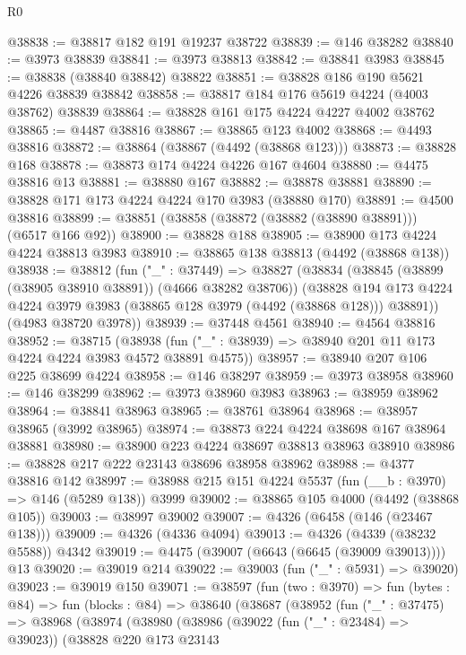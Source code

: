 \begin{lexlean}{R0}
\begin{coremodule}
@38838 := @38817 @182 @191 @19237 @38722
@38839 := @146 @38282
@38840 := @3973 @38839
@38841 := @3973 @38813
@38842 := @38841 @3983
@38845 := @38838 (@38840 @38842) @38822
@38851 := @38828 @186 @190 @5621 @4226 @38839 @38842
@38858 := @38817 @184 @176 @5619 @4224 (@4003 @38762) @38839
@38864 := @38828 @161 @175 @4224 @4227 @4002 @38762
@38865 := @4487 @38816
@38867 := @38865 @123 @4002
@38868 := @4493 @38816
@38872 := @38864 (@38867 (@4492 (@38868 @123)))
@38873 := @38828 @168
@38878 := @38873 @174 @4224 @4226 @167 @4604
@38880 := @4475 @38816 @13
@38881 := @38880 @167
@38882 := @38878 @38881
@38890 := @38828 @171 @173 @4224 @4224 @170 @3983 (@38880 @170)
@38891 := @4500 @38816
@38899 := @38851 (@38858 (@38872 (@38882 (@38890 @38891))) (@6517 @166 @92))
@38900 := @38828 @188
@38905 := @38900 @173 @4224 @4224 @38813 @3983
@38910 := @38865 @138 @38813 (@4492 (@38868 @138))
@38938 := @38812
    (fun ("_" : @37449) =>
    @38827
      (@38834
        (@38845 (@38899 (@38905 @38910 @38891)) (@4666 @38282 @38706))
        (@38828 @194 @173 @4224 @4224 @3979 @3983 (@38865 @128 @3979 (@4492 (@38868 @128))) @38891))
      (@4983 @38720 @3978))
@38939 := @37448 @4561
@38940 := @4564 @38816
@38952 := @38715
    (@38938 (fun ("_" : @38939) => @38940 @201 @11 @173 @4224 @4224 @3983 @4572 @38891 @4575))
@38957 := @38940 @207 @106 @225 @38699 @4224
@38958 := @146 @38297
@38959 := @3973 @38958
@38960 := @146 @38299
@38962 := @3973 @38960 @3983
@38963 := @38959 @38962
@38964 := @38841 @38963
@38965 := @38761 @38964
@38968 := @38957 @38965 (@3992 @38965)
@38974 := @38873 @224 @4224 @38698 @167 @38964 @38881
@38980 := @38900 @223 @4224 @38697 @38813 @38963 @38910
@38986 := @38828 @217 @222 @23143 @38696 @38958 @38962
@38988 := @4377 @38816 @142
@38997 := @38988 @215 @151 @4224 @5537 (fun (__b : @3970) => @146 (@5289 @138)) @3999
@39002 := @38865 @105 @4000 (@4492 (@38868 @105))
@39003 := @38997 @39002
@39007 := @4326 (@6458 (@146 (@23467 @138)))
@39009 := @4326 (@4336 @4094)
@39013 := @4326 (@4339 (@38232 @5588)) @4342
@39019 := @4475 (@39007 (@6643 (@6645 (@39009 @39013)))) @13
@39020 := @39019 @214
@39022 := @39003 (fun ("_" : @5931) => @39020)
@39023 := @39019 @150
@39071 := @38597
    (fun (two : @3970) =>
    fun (bytes : @84) =>
    fun (blocks : @84) =>
    @38640
      (@38687
        (@38952
          (fun ("_" : @37475) =>
          @38968
            (@38974
              (@38980
                (@38986
                  (@39022 (fun ("_" : @23484) => @39023))
                  (@38828
                    @220
                    @173
                    @23143

\end{coremodule}
\end{lexlean}
